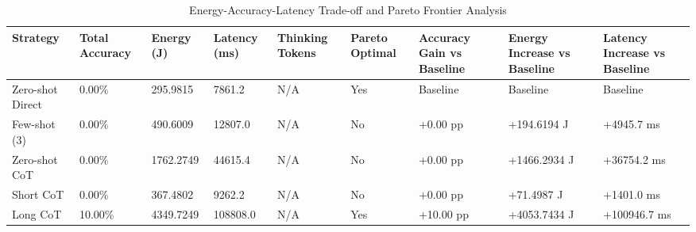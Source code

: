 \begin{table}
\caption{Energy-Accuracy-Latency Trade-off and Pareto Frontier Analysis}
\label{tab:tradeoff_comparison}
\begin{tabular}{lllllllll}
\toprule
Strategy & Total Accuracy & Energy (J) & Latency (ms) & Thinking Tokens & Pareto Optimal & Accuracy Gain vs Baseline & Energy Increase vs Baseline & Latency Increase vs Baseline \\
\midrule
Zero-shot Direct & 0.00\% & 295.9815 & 7861.2 & N/A & Yes & Baseline & Baseline & Baseline \\
Few-shot (3) & 0.00\% & 490.6009 & 12807.0 & N/A & No & +0.00 pp & +194.6194 J & +4945.7 ms \\
Zero-shot CoT & 0.00\% & 1762.2749 & 44615.4 & N/A & No & +0.00 pp & +1466.2934 J & +36754.2 ms \\
Short CoT & 0.00\% & 367.4802 & 9262.2 & N/A & No & +0.00 pp & +71.4987 J & +1401.0 ms \\
Long CoT & 10.00\% & 4349.7249 & 108808.0 & N/A & Yes & +10.00 pp & +4053.7434 J & +100946.7 ms \\
\bottomrule
\end{tabular}
\end{table}
